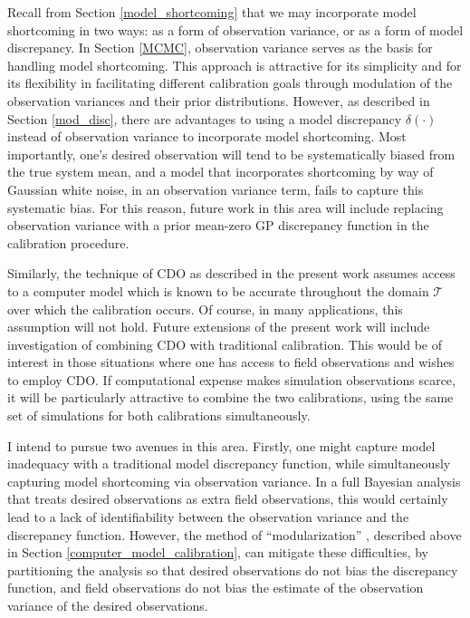 \documentclass{article}
\begin{document}
Recall from Section  \ref{model_shortcoming} that we may incorporate model shortcoming in two ways: as a form of observation variance, or as a form of model discrepancy. In Section \ref{MCMC}, observation variance serves as the basis for handling model shortcoming. This approach is attractive for its simplicity and for its flexibility in facilitating different calibration goals through modulation of the observation variances and their prior distributions. 
However, as described in Section \ref{mod_disc}, there are advantages to using a model discrepancy $\delta(\cdot)$ instead of observation variance to incorporate model shortcoming. Most importantly, one's desired observation will tend to be systematically biased from the true system mean, and a model that incorporates shortcoming by way of Gaussian white noise, in an observation variance term, fails to capture this systematic bias. For this reason, future work in this area will include replacing observation variance with a prior mean-zero GP discrepancy function in the calibration procedure.

Similarly, the technique of CDO as described in the present work assumes access to a computer model which is known to be accurate throughout the domain $\mathcal T$ over which the calibration occurs. Of course, in many applications, this assumption will not hold. Future extensions of the present work will include investigation of combining CDO with traditional calibration. This would be of interest in those situations where one has access to field observations and wishes to employ CDO. If computational expense makes simulation observations scarce, it will be particularly attractive to combine the two calibrations, using the same set of simulations for both calibrations simultaneously.

I intend to pursue two avenues in this area. Firstly, one might capture model inadequacy with a traditional model discrepancy function, while simultaneously capturing model shortcoming via observation variance. In a full Bayesian analysis that treats desired observations as extra field observations, this would certainly lead to a lack of identifiability between the observation variance and the discrepancy function. However, the method of ``modularization'' \citep{Liu2009,Bayarri2007,Bayarri}, described above in Section \ref{computer_model_calibration}, can mitigate these difficulties, by partitioning the analysis so that desired observations do not bias the discrepancy function, and field observations do not bias the estimate of the observation variance of the desired observations.
\end{document}
